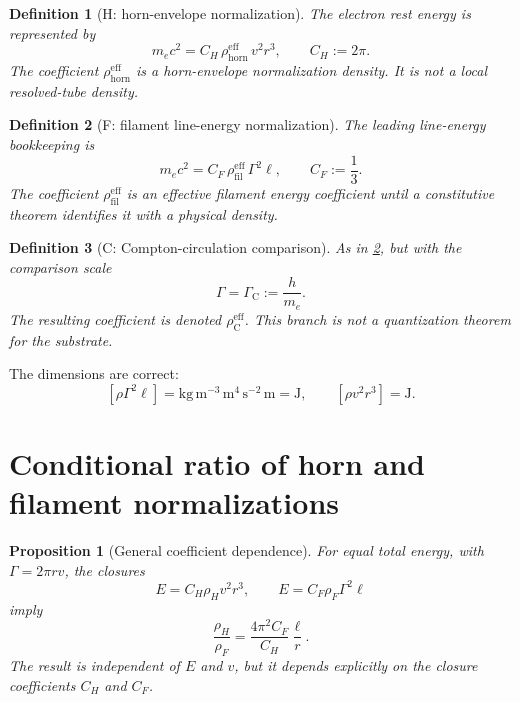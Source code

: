 \documentclass[aps,pre,preprint,notitlepage,nofootinbib,superscriptaddress]{revtex4-2}
\newcommand{\rhohorn}{\rho_{\mathrm{horn}}^{\mathrm{eff}}}
\newcommand{\rhofil}{\rho_{\mathrm{fil}}^{\mathrm{eff}}}
\newcommand{\rhoCeff}{\rho_{\mathrm C}^{\mathrm{eff}}}
\newcommand{\GammaC}{\Gamma_{\mathrm C}}
\newtheorem{proposition}{Proposition}
\newtheorem{definition}{Definition}
\begin{document}
\begin{definition}[H: horn-envelope normalization]
\label{def:H}
The electron rest energy is represented by
\begin{equation}
  m_ec^2
  =
  C_H\,\rhohorn\,v^2r^3,
  \qquad
  C_H:=2\pi.
  \label{eq:H}
\end{equation}
The coefficient \(\rhohorn\) is a horn-envelope normalization density.  It is not a local resolved-tube density.
\end{definition}

\begin{definition}[F: filament line-energy normalization]
\label{def:F}
The leading line-energy bookkeeping is
\begin{equation}
  m_ec^2
  =
  C_F\,\rhofil\,\Gamma^2\ell,
  \qquad
  C_F:=\frac13.
  \label{eq:F}
\end{equation}
The coefficient \(\rhofil\) is an effective filament energy coefficient until a constitutive theorem identifies it with a physical density.
\end{definition}

\begin{definition}[C: Compton-circulation comparison]
\label{def:C}
As in \cref{def:F}, but with the comparison scale
\begin{equation}
  \Gamma=\GammaC:=\frac{h}{m_e}.
  \label{eq:C}
\end{equation}
The resulting coefficient is denoted \(\rhoCeff\).  This branch is not a quantization theorem for the substrate.
\end{definition}

The dimensions are correct:
\[
[\rho\Gamma^2\ell]
=
\mathrm{kg\,m^{-3}}\,
\mathrm{m^4\,s^{-2}}\,
\mathrm m
=
\mathrm J,
\qquad
[\rho v^2r^3]=\mathrm J.
\]

\section{Conditional ratio of horn and filament normalizations}
\label{sec:ratio}

\begin{proposition}[General coefficient dependence]
\label{prop:general-ratio}
For equal total energy, with \(\Gamma=2\pi rv\), the closures
\[
E=C_H\rho_Hv^2r^3,
\qquad
E=C_F\rho_F\Gamma^2\ell
\]
imply
\begin{equation}
  \boxed{
  \frac{\rho_H}{\rho_F}
  =
  \frac{4\pi^2C_F}{C_H}\frac{\ell}{r}
  }.
  \label{eq:general-ratio}
\end{equation}
The result is independent of \(E\) and \(v\), but it depends explicitly on the closure coefficients \(C_H\) and \(C_F\).
\end{proposition}
\end{document}
